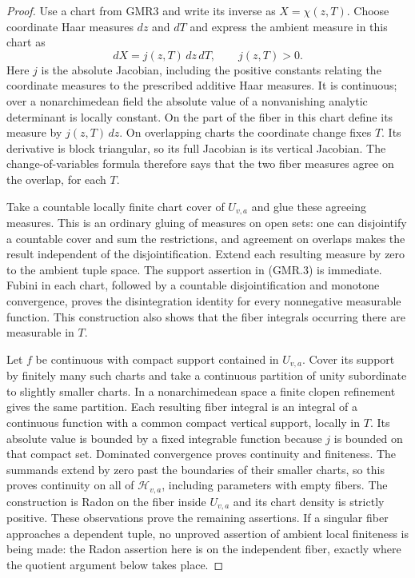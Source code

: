 \begin{proof}
Use a chart from GMR3 and write its inverse as $X=\chi(z,T)$.
Choose coordinate Haar measures $dz$ and $dT$ and express the ambient
measure in this chart as
\[
 dX=j(z,T)\,dz\,dT,\qquad j(z,T)>0.
 \tag{GMR.9}
\]
Here $j$ is the absolute Jacobian, including the positive constants
relating the coordinate measures to the prescribed additive Haar
measures.  It is continuous; over a nonarchimedean field the absolute
value of a nonvanishing analytic determinant is locally constant.
On the part of the fiber in this chart define its measure by
$j(z,T)\,dz$.  On overlapping charts the coordinate change fixes $T$.
Its derivative is block triangular, so its full Jacobian is its
vertical Jacobian.  The change-of-variables formula therefore says
that the two fiber measures agree on the overlap, for each $T$.

Take a countable locally finite chart cover of $U_{v,a}$ and glue these
agreeing measures.  This is an ordinary gluing of measures on open
sets: one can disjointify a countable cover and sum the restrictions,
and agreement on overlaps makes the result independent of the
disjointification.  Extend each resulting measure by zero to the
ambient tuple space.  The support assertion in (GMR.3) is immediate.
Fubini in each chart, followed by a countable disjointification and
monotone convergence, proves the disintegration identity for every
nonnegative measurable function.  This construction also shows that
the fiber integrals occurring there are measurable in $T$.

Let $f$ be continuous with compact support contained in $U_{v,a}$.
Cover its support by finitely many such charts and take a continuous
partition of unity subordinate to slightly smaller charts.  In a
nonarchimedean space a finite clopen refinement gives the same
partition.  Each resulting fiber integral is an integral of a
continuous function with a common compact vertical support, locally
in $T$.  Its absolute value is bounded by a fixed integrable function
because $j$ is bounded on that compact set.  Dominated convergence
proves continuity and finiteness.  The summands extend by zero past
the boundaries of their smaller charts, so this proves continuity on
all of $\mathcal H_{v,a}$, including parameters with empty fibers.
The construction is Radon on the fiber inside $U_{v,a}$ and its chart
density is strictly positive.  These observations prove the remaining
assertions.  If a singular fiber approaches a dependent tuple, no
unproved assertion of ambient local finiteness is being made: the
Radon assertion here is on the independent fiber, exactly where the
quotient argument below takes place.
\end{proof}

